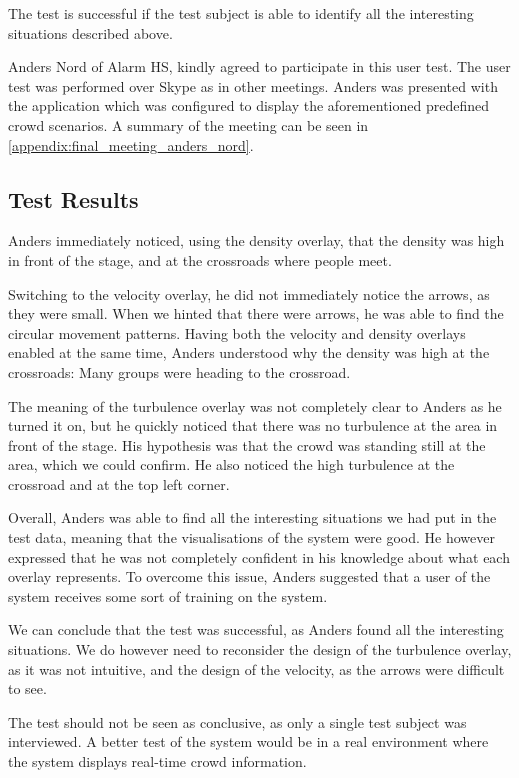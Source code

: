 The test is successful if the test subject is able to identify all the interesting situations described above. 

Anders Nord of Alarm HS, kindly agreed to participate in this user test. The user test was performed over Skype as in other meetings. Anders was presented with the application which was configured to display the aforementioned predefined crowd scenarios. A summary of the meeting can be seen in \cref{appendix:final_meeting_anders_nord}.

\subsection{Test Results}
Anders immediately noticed, using the density overlay, that the density was high in front of the stage, and at the crossroads where people meet. 

Switching to the velocity overlay, he did not immediately notice the arrows, as they were small. When we hinted that there were arrows, he was able to find the circular movement patterns. Having both the velocity and density overlays enabled at the same time, Anders understood why the density was high at the crossroads: Many groups were heading to the crossroad.

The meaning of the turbulence overlay was not completely clear to Anders as he turned it on, but he quickly noticed that there was no turbulence at the area in front of the stage. His hypothesis was that the crowd was standing still at the area, which we could confirm. He also noticed the high turbulence at the crossroad and at the top left corner.

Overall, Anders was able to find all the interesting situations we had put in the test data, meaning that the visualisations of the system were good. He however expressed that he was not completely confident in his knowledge about what each overlay represents. To overcome this issue, Anders suggested that a user of the system receives some sort of training on the system. 

We can conclude that the test was successful, as Anders found all the interesting situations. We do however need to reconsider the design of the turbulence overlay, as it was not intuitive, and the design of the velocity, as the arrows were difficult to see.

The test should not be seen as conclusive, as only a single test subject was interviewed. A better test of the system would be in a real environment where the system displays real-time crowd information.
